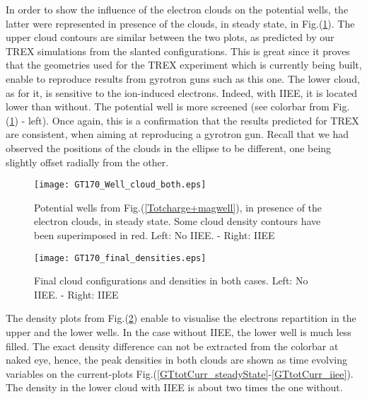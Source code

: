 In order to show the influence of the electron clouds on the potential wells, the latter were represented in presence of the clouds, in steady state, in Fig.(\ref{Well_cloud_both}). The upper cloud contours are similar between the two plots, as predicted by our TREX simulations from the slanted configurations. This is great since it proves that the geometries used for the TREX experiment which is currently being built, enable to reproduce results from gyrotron guns such as this one. The lower cloud, as for it, is sensitive to the ion-induced electrons. Indeed, with IIEE, it is located lower than without. The potential well is more screened (see colorbar from Fig.(\ref{Well_cloud_both}) - left). Once again, this is a confirmation that the results predicted for TREX are consistent, when aiming at reproducing a gyrotron gun. Recall that we had observed the positions of the clouds in the ellipse to be different, one being slightly offset radially from the other.\\

\begin{figure}[h!]
\centering
	\texttt{[image: GT170\_Well\_cloud\_both.eps]}
	\caption{\label{Well_cloud_both} Potential wells from Fig.(\ref{Totcharge+magwell}), in presence of the electron clouds, in steady state. Some cloud density contours have been superimposed in red. Left: No IIEE. - Right: IIEE}
\end{figure}


\begin{figure}[h!]
\centering
	\texttt{[image: GT170\_final\_densities.eps]}
	\caption{\label{GT_final_densities} Final cloud configurations and densities in both cases. Left: No IIEE. - Right: IIEE}
\end{figure}

The density plots from Fig.(\ref{GT_final_densities}) enable to visualise the electrons repartition in the upper and the lower wells. In the case without IIEE, the lower well is much less filled. The exact density difference can not be extracted from the colorbar at naked eye, hence, the peak densities in both clouds are shown as time evolving variables on the current-plots Fig.(\ref{GTtotCurr_steadyState}-\ref{GTtotCurr_iiee}). The density in the lower cloud with IIEE is about two times the one without. \\

